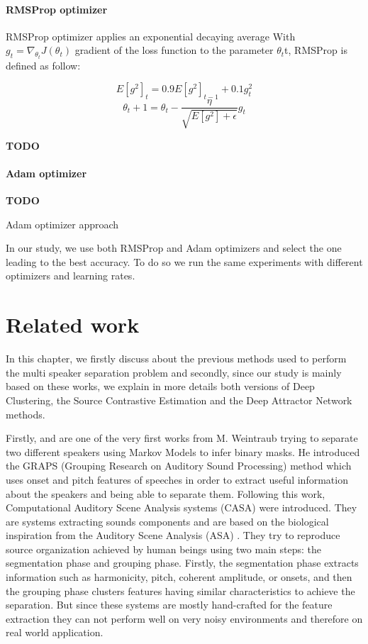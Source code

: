 \documentclass[master,final,11pt]{iscs-thesis}
\begin{document}
\subsubsection{RMSProp optimizer}
RMSProp optimizer applies an exponential decaying average
With $g_t = \nabla_{\theta_t}J(\theta_t)$ gradient of the loss function to the parameter $\theta_t$t, RMSProp is defined as follow:

\[E[g^2]_t = 0.9E[g^2]_{t-1} +0.1g^2_t\]
\[\theta_t+1 = \theta_t - \frac{\eta}{\sqrt{E[g^2]+\epsilon}} g_t\]

\textbf{TODO}

\subsubsection{Adam optimizer}

\textbf{TODO}

Adam optimizer \cite{ADAM} approach 

In our study, we use both RMSProp and Adam optimizers and select the one leading to the best accuracy. To do so we run the same experiments with different optimizers and learning rates.

\chapter{Related work}

In this chapter, we firstly discuss about the previous methods used to perform the multi speaker separation problem and secondly, since our study is mainly based on these works, we explain in more details both versions of Deep Clustering, the Source Contrastive Estimation and the Deep Attractor Network methods.

Firstly, \cite{Weintraub:1985:TCM:912498} and \cite{ GRAPS} are one of the very first works from M. Weintraub trying to separate two different speakers using Markov Models to infer binary masks. He introduced the GRAPS (Grouping Research on Auditory Sound Processing) method which uses onset and pitch features of speeches in order to extract useful information about the speakers and being able to separate them.
Following this work, Computational Auditory Scene Analysis systems (CASA) \cite{CASA1, CASA2} were introduced. They are systems extracting sounds components and are based on the biological inspiration from the Auditory Scene Analysis (ASA) \cite{ASA}. They try to reproduce source organization achieved by human beings using two main steps: the segmentation phase and grouping phase. Firstly, the segmentation phase extracts information such as harmonicity, pitch, coherent amplitude, or onsets, and then the grouping phase clusters features having similar characteristics to achieve the separation. But since these systems are mostly hand-crafted for the feature extraction they can not perform well on very noisy environments and therefore on real world application. 
\end{document}
